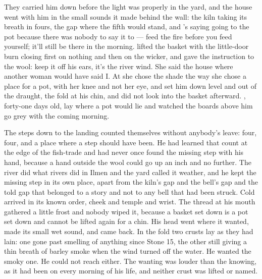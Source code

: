 
They carried him down before the light was properly in the yard, and the house went with him in the small sounds it made behind the wall: the kiln taking its breath in fours, the gap where the fifth would stand, and 's saying going to the pot because there was nobody to say it to --- feed the fire before you feed yourself; it'll still be there in the morning.  lifted the basket with the little-door burn closing first on nothing and then on the wicker, and gave the instruction to the wool: keep it off his ears, it's the river wind. She said the house where another woman would have said I. At  she chose the shade the way she chose a place for a pot, with her knee and not her eye, and set him down level and out of the draught, the fold at his chin, and did not look into the basket afterward. , forty-one days old, lay where a pot would lie and watched the boards above him go grey with the coming morning.

The steps down to the landing counted themselves without anybody's leave: four, four, and a place where a step should have been. He had learned that count at the edge of the fish-trade and had never once found the missing step with his hand, because a hand outside the wool could go up an inch and no further. The river did what rivers did in Ilmen and the yard called it weather, and he kept the missing step in its own place, apart from the kiln's gap and the bell's gap and the told gap that belonged to a story and not to any bell that had been struck. Cold arrived in its known order, cheek and temple and wrist. The thread at his mouth gathered a little frost and nobody wiped it, because a basket set down is a pot set down and cannot be lifted again for a chin. His head went where it wanted, made its small wet sound, and came back. In the fold two crusts lay as they had lain: one gone past smelling of anything since Stone 15, the other still giving a thin breath of barley smoke when the wind turned off the water. He wanted the smoky one. He could not reach either. The wanting was louder than the knowing, as it had been on every morning of his life, and neither crust was lifted or named.


